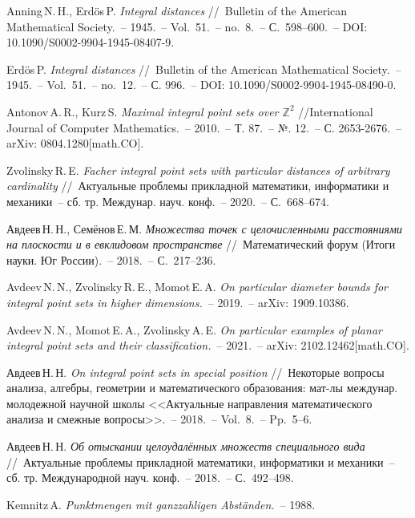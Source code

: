 \documentclass[10pt,pdf,hyperref={unicode},aspectratio=169]{beamer}
\theoremstyle{definition}
\begin{document}

\begin{frame}
	\begin{thebibliography}{99}
		\setlength\itemsep{0pt}\scriptsize

		Anning\,N.\,H., Erd{\"o}s\,P. {\it Integral distances} //~Bulletin of the American Mathematical Society.~--
		1945.~-- Vol.~51.~-- no.~8.~-- С.~598--600.~-- DOI: 10.1090/S0002-9904-1945-08407-9.

		Erd{\"o}s\,P. {\it Integral distances} //~Bulletin of the American Mathematical Society.~--
		1945.~-- Vol.~51.~-- no.~12.~-- С. 996.~-- DOI: 10.1090/S0002-9904-1945-08490-0.

		Antonov\,A.\,R., Kurz\,S. {\it Maximal integral point sets over $\mathbb{Z}^2$}
		//International Journal of Computer Mathematics.~-- 2010.~-- Т. 87.~-- №. 12.~-- С. 2653-2676.~-- arXiv: 0804.1280[math.CO].

		Zvolinsky\,R.\,E. {\it Facher integral point sets with particular distances of arbitrary cardinality} //~Актуальные
		проблемы прикладной математики, информатики и механики~-- сб. тр. Междунар. науч. конф.~-- 2020.~-- С.~668--674.

		Авдеев\,Н.\,Н., Семёнов\,Е.\,М. {\it Множества точек с целочисленными расстояниями на плоскости и в евклидовом пространстве}
		//~Математический форум (Итоги науки. Юг России).~-- 2018.~-- С.~217--236.

		Avdeev\,N.\,N., Zvolinsky\,R.\,E., Momot\,E.\,A. {\it On particular diameter bounds for integral point sets in higher dimensions.}~--
		2019.~-- arXiv: 1909.10386.

		Avdeev\,N.\,N., Momot\,E.\,A., Zvolinsky\,A.\,E. {\it On particular examples of planar integral point sets and their classification.}~--
		2021.~-- arXiv: 2102.12462[math.CO].

		Авдеев\,Н.\,Н. {\it On integral point sets in special position} //~Некоторые вопросы анализа, алгебры, геометрии и
		математического образования: мат-лы междунар. молодежной научной школы <<Актуальные направления математического
		анализа и смежные вопросы>>.~-- 2018.~-- Vol.~8.~-- Pp.~5--6.

		Авдеев\,Н.\,Н. {\it Об отыскании целоудалённых множеств специального вида}
		//~Актуальные проблемы прикладной математики, информатики и механики~-- сб. тр.
		Международной науч. конф.~-- 2018.~-- С.~492--498.

		Kemnitz\,A. {\it Punktmengen mit ganzzahligen Abst{\"a}nden.}~-- 1988.
	\end{thebibliography}

\end{frame}
\end{document}
